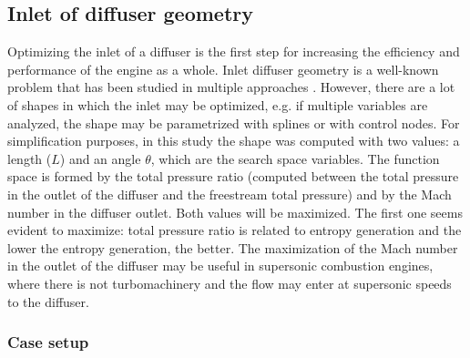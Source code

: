 \newpage

\subsection{Inlet of diffuser geometry}

Optimizing the inlet of a diffuser is the first step for increasing the efficiency and performance of the engine as a whole. Inlet diffuser geometry is a well-known problem that has been studied in multiple approaches \cite{djebedjian2004two} \cite{schmandt2011diffuser}. However, there are a lot of shapes in which the inlet may be optimized, e.g. if multiple variables are analyzed, the shape may be parametrized with splines or with control nodes. For simplification purposes, in this study the shape was computed with two values: a length ($L$) and an angle $\theta$, which are the search space variables. The function space is formed by the total pressure ratio (computed between the total pressure in the outlet of the diffuser and the freestream total pressure) and by the Mach number in the diffuser outlet. Both values will be maximized. The first one seems evident to maximize: total pressure ratio is related to entropy generation and the lower the entropy generation, the better. The maximization of the Mach number in the outlet of the diffuser may be useful in supersonic combustion engines, where there is not turbomachinery and the flow may enter at supersonic speeds to the diffuser. 

\subsubsection*{Case setup}

